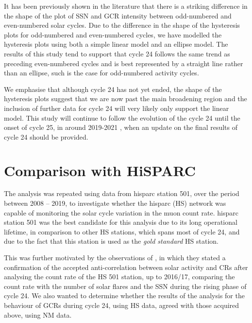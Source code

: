 It has been previously shown in the literature that there is a striking difference in the shape of the plot of SSN and GCR intensity between odd-numbered and even-numbered solar cycles. Due to the difference in the shape of the hysteresis plots for odd-numbered and even-numbered cycles, we have modelled the hysteresis plots using both a simple linear model and an ellipse model. The results of this study tend to support that cycle 24 follows the same trend as preceding even-numbered cycles and is best represented by a straight line rather than an ellipse, such is the case for odd-numbered activity cycles.

We emphasise that although cycle 24 has not yet ended, the shape of the hysteresis plots suggest that we are now past the main broadening region and the inclusion of further data for cycle 24 will very likely only support the linear model. This study will continue to follow the evolution of the cycle 24 until the onset of cycle 25, in around 2019-2021 \citep{howe_signatures_2018, upton_updated_2018, pesnell_early_2018}, when an update on the final results of cycle 24 should be provided.







\section{Comparison with HiSPARC}\label{sec:HS_vs_SSN}

The analysis was repeated using data from \gls{hisparc} station 501, over the period between 2008 -- 2019, to investigate whether the \gls{hisparc} (HS) network was capable of monitoring the solar cycle variation in the muon count rate. \gls{hisparc} station 501 was the best candidate for this analysis due to its long operational lifetime, in comparison to other HS stations, which spans most of cycle 24, and due to the fact that this station is used as the {\it gold standard} HS station. 

This was further motivated by the observations of \citet{fan_analysis_2018}, in which they stated a confirmation of the accepted anti-correlation between solar activity and CRs after analysing the count rate of the HS 501 station, up to 2016/17, comparing the count rate with the number of solar flares and the SSN during the rising phase of cycle 24. We also wanted to determine whether the results of the analysis for the behaviour of GCRs during cycle 24, using HS data, agreed with those acquired above, using NM data.

